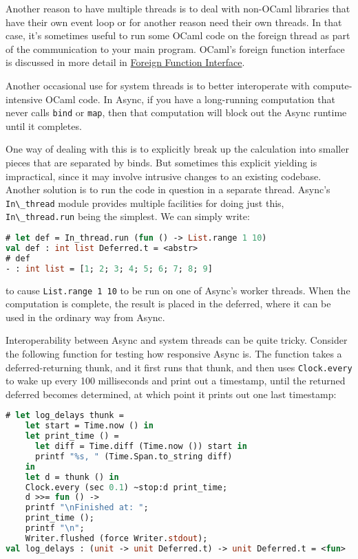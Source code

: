 Another reason to have multiple threads is to deal with non-OCaml
libraries that have their own event loop or for another reason need
their own threads. In that case, it's sometimes useful to run some OCaml
code on the foreign thread as part of the communication to your main
program. OCaml's foreign function interface is discussed in more detail
in
\href{foreign-function-interface.html\#foreign-function-interface}{Foreign
Function Interface}.

Another occasional use for system threads is to better interoperate with
compute-intensive OCaml code. In Async, if you have a long-running
computation that never calls \passthrough{\lstinline!bind!} or
\passthrough{\lstinline!map!}, then that computation will block out the
Async runtime until it completes.

One way of dealing with this is to explicitly break up the calculation
into smaller pieces that are separated by binds. But sometimes this
explicit yielding is impractical, since it may involve intrusive changes
to an existing codebase. Another solution is to run the code in question
in a separate thread. Async's \passthrough{\lstinline!In\_thread!}
module provides multiple facilities for doing just this,
\passthrough{\lstinline!In\_thread.run!} being the simplest. We can
simply write: 

\begin{lstlisting}[language=Caml]
# let def = In_thread.run (fun () -> List.range 1 10)
val def : int list Deferred.t = <abstr>
# def
- : int list = [1; 2; 3; 4; 5; 6; 7; 8; 9]
\end{lstlisting}

to cause \passthrough{\lstinline!List.range 1 10!} to be run on one of
Async's worker threads. When the computation is complete, the result is
placed in the deferred, where it can be used in the ordinary way from
Async.

Interoperability between Async and system threads can be quite tricky.
Consider the following function for testing how responsive Async is. The
function takes a deferred-returning thunk, and it first runs that thunk,
and then uses \passthrough{\lstinline!Clock.every!} to wake up every 100
milliseconds and print out a timestamp, until the returned deferred
becomes determined, at which point it prints out one last timestamp:

\begin{lstlisting}[language=Caml]
# let log_delays thunk =
    let start = Time.now () in
    let print_time () =
      let diff = Time.diff (Time.now ()) start in
      printf "%s, " (Time.Span.to_string diff)
    in
    let d = thunk () in
    Clock.every (sec 0.1) ~stop:d print_time;
    d >>= fun () ->
    printf "\nFinished at: ";
    print_time ();
    printf "\n";
    Writer.flushed (force Writer.stdout);
val log_delays : (unit -> unit Deferred.t) -> unit Deferred.t = <fun>
\end{lstlisting}


